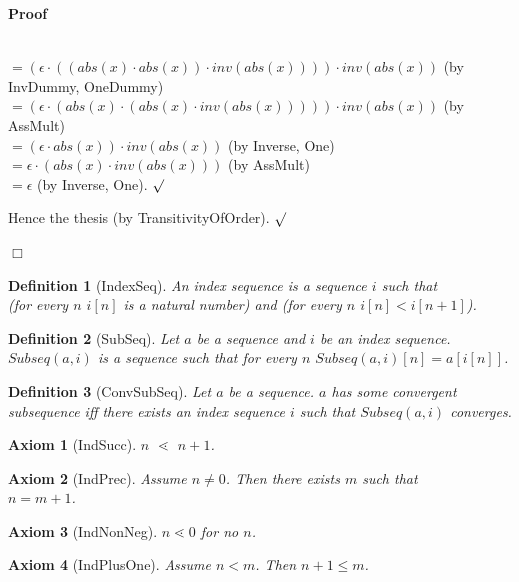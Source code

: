 \documentclass{article}
\newenvironment{forthel}{\begin{leftbar}}{\end{leftbar}}
\newenvironment{proof}{\noindent\textbf{Proof\ }}{\hspace*{\fill}$\Box$\medskip}
\newenvironment{subproof}{\begin{list}{}{}
		\item[\text{Proof}]}{\hfill $\surd$ \end{list}}
\newtheorem{axiom}{Axiom}
\newtheorem{definition}{Definition}
\newcommand{\dotequal}{=}
\begin{document}
\begin{forthel}
\begin{proof}
\begin{subproof}
\begin{subproof}
	\\$\dotequal (\epsilon \cdot ((abs(x) \cdot abs(x)) \cdot inv(abs(x)))) \cdot inv(abs(x))$ (by InvDummy, OneDummy)
	\\$\dotequal (\epsilon \cdot (abs(x) \cdot (abs(x) \cdot inv(abs(x))))) \cdot inv(abs(x))$ (by AssMult)
	\\$\dotequal (\epsilon \cdot abs(x)) \cdot inv(abs(x))$ (by Inverse, One)
	\\$\dotequal \epsilon \cdot (abs(x) \cdot inv(abs(x)))$ (by AssMult)
	\\$\dotequal \epsilon$ (by Inverse, One).
	\end{subproof}
	Hence the thesis (by TransitivityOfOrder).
	\end{subproof}
	\end{proof}

	
	\begin{definition}[IndexSeq]
		An index sequence is a sequence $i$ such that \\
		(for every $n$ $i[n]$ is a natural number) and (for every $n$ $i[n] < i[n + 1]$).
	\end{definition}
	
	\begin{definition}[SubSeq]
		Let $a$ be a sequence and $i$ be an index sequence. $Subseq(a,i)$ is a sequence such that for every $n$
		$Subseq(a,i)[n] = a[i[n]]$.
	\end{definition}
	
	\begin{definition}[ConvSubSeq]
		Let $a$ be a sequence. $a$ has some convergent subsequence iff there exists an index sequence $i$ such that $Subseq(a,i)$ converges.
	\end{definition}
	
	\begin{axiom}[IndSucc]
		$n$ $\lessdot$ $n + 1$. 
	\end{axiom}
	
	\begin{axiom}[IndPrec]
		Assume $n \neq 0$. Then there exists $m$ such that \\ $n = m + 1$.
	\end{axiom}
	
	\begin{axiom}[IndNonNeg]
		$n \lessdot 0$ for no $n$.
	\end{axiom}
	
	\begin{axiom}[IndPlusOne]
		Assume $n < m$. Then $n + 1 \leq m$.
	\end{axiom}
	

\end{forthel}
\end{document}
